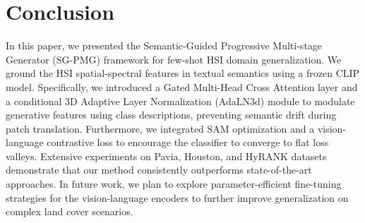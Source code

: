 \section{Conclusion}
\label{sec:conclusion}

In this paper, we presented the Semantic-Guided Progressive Multi-stage Generator (SG-PMG) framework for few-shot HSI domain generalization. We ground the HSI spatial-spectral features in textual semantics using a frozen CLIP model. Specifically, we introduced a Gated Multi-Head Cross Attention layer and a conditional 3D Adaptive Layer Normalization (AdaLN3d) module to modulate generative features using class descriptions, preventing semantic drift during patch translation. Furthermore, we integrated SAM optimization and a vision-language contrastive loss to encourage the classifier to converge to flat loss valleys. Extensive experiments on Pavia, Houston, and HyRANK datasets demonstrate that our method consistently outperforms state-of-the-art approaches. In future work, we plan to explore parameter-efficient fine-tuning strategies for the vision-language encoders to further improve generalization on complex land cover scenarios.
